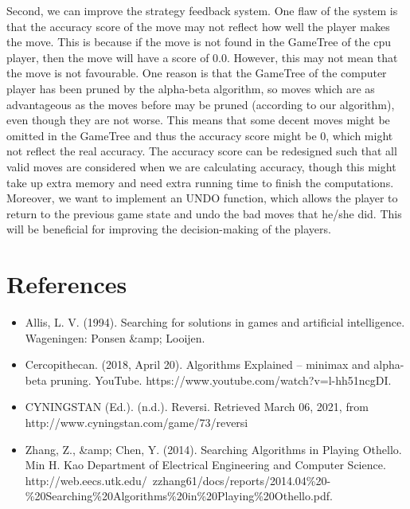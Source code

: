 \documentclass[fontsize=11pt]{article}
\begin{document}
Second, we can improve the strategy feedback system. One flaw of the system is that the accuracy score of the move may not reflect how well the player makes the move. This is because if the move is not found in the GameTree of the cpu player, then the move will have a score of 0.0. However, this may not mean that the move is not favourable. One reason is that the GameTree of the computer player has been pruned by the alpha-beta algorithm, so moves which are as advantageous as the moves before may be pruned (according to our algorithm), even though they are not worse. This means that some decent moves might be omitted in the GameTree and thus the accuracy score might be 0, which might not reflect the real accuracy. The accuracy score can be redesigned such that all valid moves are considered when we are calculating accuracy, though this might take up extra memory and need extra running time to finish the computations. Moreover, we want to implement an UNDO function, which allows the player to return to the previous game state and undo the bad moves that he/she did. This will be beneficial for improving the decision-making of the players.\\
\section*{References}
\begin{itemize}
    \item Allis, L. V. (1994). Searching for solutions in games and artificial intelligence. Wageningen: Ponsen &amp; Looijen.
    \item Cercopithecan. (2018, April 20). Algorithms Explained – minimax and alpha-beta pruning. YouTube. https://www.youtube.com/watch?v=l-hh51ncgDI. 
    \item CYNINGSTAN (Ed.). (n.d.). Reversi. Retrieved March 06, 2021, from http://www.cyningstan.com/game/73/reversi
    \item  Zhang, Z., &amp; Chen, Y. (2014). Searching Algorithms in Playing Othello. Min H. Kao Department of Electrical Engineering and Computer Science. http://web.eecs.utk.edu/~zzhang61/docs/reports/2014.04\%20-\%20Searching\%20Algorithms\%20in\%20Playing\%20Othello.pdf. 
\end{itemize}
\end{document}

